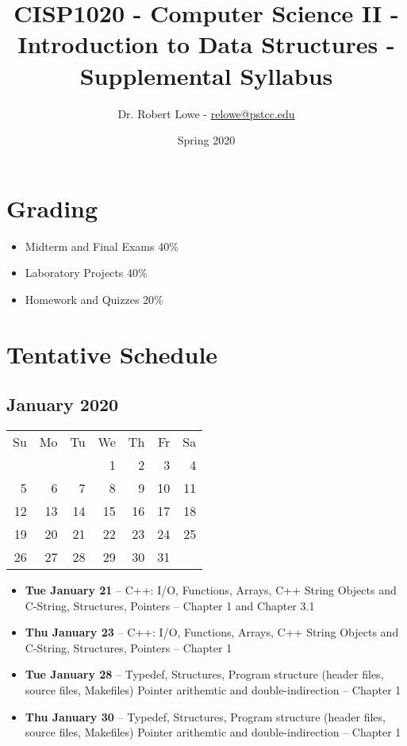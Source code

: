 \documentclass{article}
\title{CISP1020 - Computer Science II - Introduction to Data
Structures - Supplemental Syllabus}
\author{Dr. Robert Lowe - \href{mailto:relowe@pstcc.edu}{relowe@pstcc.edu}}
\date{Spring 2020}
\begin{document}
\maketitle

\section{Grading}
\begin{itemize}
    \item Midterm and Final Exams 40\%
    \item Laboratory Projects 40\%
    \item Homework and Quizzes 20\%
\end{itemize}

\section{Tentative Schedule}
\subsection*{January 2020}
\begin{tabular}{rrrrrrr}
Su & Mo & Tu & We & Th & Fr & Sa\\
   &    &    &  1 &  2 &  3 &  4\\ 
 5 &  6 &  7 &  8 &  9 & 10 & 11\\ 
12 & 13 & 14 & 15 & 16 & 17 & 18\\ 
19 & 20 & 21 & 22 & 23 & 24 & 25\\ 
26 & 27 & 28 & 29 & 30 & 31 &\\
\end{tabular}

\begin{itemize}
\item \textbf{Tue January 21} 
    -- C++: I/O, Functions, Arrays, C++ String Objects and C-String,
       Structures, Pointers 
    -- Chapter 1 and Chapter 3.1
\item \textbf{Thu January 23} 
    -- C++: I/O, Functions, Arrays, C++ String Objects and C-String,
       Structures, Pointers
    -- Chapter 1
\item \textbf{Tue January 28} 
    -- Typedef, Structures, Program structure (header files, source
       files, Makefiles) Pointer arithemtic and double-indirection
    -- Chapter 1
\item \textbf{Thu January 30} 
    -- Typedef, Structures, Program structure (header files, source
       files, Makefiles) Pointer arithemtic and double-indirection
    -- Chapter 1
\end{itemize}
\end{document}
